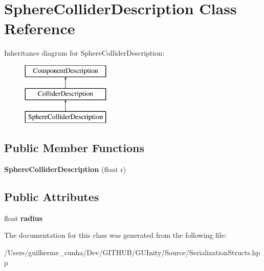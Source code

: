 \hypertarget{class_sphere_collider_description}{}\section{Sphere\+Collider\+Description Class Reference}
\label{class_sphere_collider_description}
Inheritance diagram for Sphere\+Collider\+Description\+:\begin{figure}[H]
\begin{center}
\leavevmode
\includegraphics[height=3.000000cm]{class_sphere_collider_description}
\end{center}
\end{figure}
\subsection*{Public Member Functions}
\begin{DoxyCompactItemize}
\item 
\hypertarget{class_sphere_collider_description_aca0d6e9f7147d60e2db61fb726b6e328}{}{\bfseries Sphere\+Collider\+Description} (float r)\label{class_sphere_collider_description_aca0d6e9f7147d60e2db61fb726b6e328}

\end{DoxyCompactItemize}
\subsection*{Public Attributes}
\begin{DoxyCompactItemize}
\item 
\hypertarget{class_sphere_collider_description_a004e6b84a3e68f74446b33d1fac63f06}{}float {\bfseries radius}\label{class_sphere_collider_description_a004e6b84a3e68f74446b33d1fac63f06}

\end{DoxyCompactItemize}


The documentation for this class was generated from the following file\+:\begin{DoxyCompactItemize}
\item 
/\+Users/guilherme\+\_\+cunha/\+Dev/\+G\+I\+T\+H\+U\+B/\+G\+U\+Inity/\+Source/Serialization\+Structs.\+hpp\end{DoxyCompactItemize}
